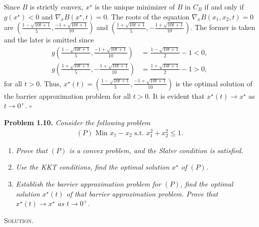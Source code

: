 \documentclass[a4paper]{article}
\numberwithin{equation}{section}
\begin{document}
\begin{enumerate}
Since $B$ is strictly convex, $x^\star$ is the unique minimizer of $B$ in ${C_B}$ if and only if $g\left(x^\star\right)<0$ and $\nabla _x B\left( {{x^\star},t} \right) = 0$. The roots of the equation $\nabla _x B\left( {x_1,x_2,t} \right) = 0$ are $\left( {\frac{{1 - \sqrt {10t + 1} }}{5},\frac{{ - 1 + \sqrt {10t + 1} }}{{10}}} \right)$ and $\left( {\frac{{1 + \sqrt {10t + 1} }}{5}, - \frac{{1 + \sqrt {10t + 1} }}{{10}}} \right)$. The former is taken and the later is omitted since 
\begin{align}
g\left( {\frac{{1 - \sqrt {10t + 1} }}{5},\frac{{ - 1 + \sqrt {10t + 1} }}{{10}}} \right) &= \frac{{1 - \sqrt {10t + 1} }}{2} - 1 < 0,\\
g\left( {\frac{{1 + \sqrt {10t + 1} }}{5}, - \frac{{1 + \sqrt {10t + 1} }}{{10}}} \right) &= \frac{{1 + \sqrt {10t + 1} }}{2} - 1 > 0,
\end{align}
for all $t>0$. Thus, $x^\star \left( t \right) = \left( {\frac{{1 - \sqrt {10t + 1} }}{5},\frac{{ - 1 + \sqrt {10t + 1} }}{{10}}} \right)$ is the optimal solution of the barrier approximation problem for all $t>0$. It is evident that $x^\star \left(t\right)\to x^\star$ as $t\to 0^+$. \hfill $\square$
\end{enumerate}
\textbf{Problem 1.10.} \textit{Consider the following problem}
\begin{align}
\left( P \right)\mbox{ Min } {x_1} - {x_2}\mbox{ s.t. } x_1^2 + x_2^2 \le 1.
\end{align}
\begin{enumerate}
\item \textit{Prove that $\left(P\right)$ is a convex problem, and the Slater condition is satisfied.}
\item \textit{Use the KKT conditions, find the optimal solution $x^\star$ of $\left(P\right)$.}
\item \textit{Establish the barrier approximation problem for $\left(P\right)$, find the optimal solution $x^\star \left(t\right)$ of that barrier approximation problem. Prove that $x^\star \left(t\right)\to x^\star$ as $t\to 0^+$.}
\end{enumerate}
\textsc{Solution.}
\end{document}
